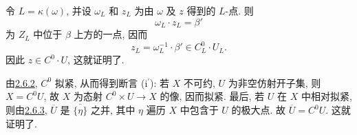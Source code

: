令 \(L=\kappa(\omega)\), 并设 \(\omega_L\) 和 \(z_L\)
为由 \(\omega\) 及 \(z\) 得到的 \(L\)-点. 则
\[
  \omega_L\cdot z_L=\beta'
\]
为 \(Z_L\) 中位于 \(\beta\) 上方的一点, 因而
\[
  z_L=\omega_L^{-1}\cdot\beta'\in C^0_L\cdot U_L.
\]
因此 \(z\in C^0\cdot U\), 这就证明了.

由\hyperref[cor:sga3-VIA-2.6.2]{2.6.2}, \(C^0\) 拟紧,
从而得到断言 (i\(^{\prime}\)): 若 \(X\) 不可约,
\(U\) 为非空仿射开子集, 则 \(X=C^0U\),
故 \(X\) 为态射 \(C^0\times U\to X\) 的像, 因而拟紧.
最后, 若 \(U\) 在 \(X\) 中相对拟紧,
则由\hyperref[rem:sga3-VIA-2.6.3]{2.6.3}, \(\overline U\)
是 \(\overline{\{\eta\}}\) 之并, 其中 \(\eta\) 遍历 \(X\) 中包含于 \(U\) 的极大点.
故 \(\overline U=C^0U\). 这就证明了.
